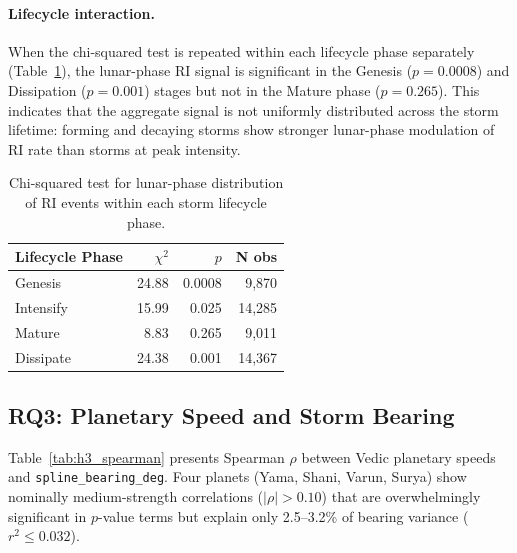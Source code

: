 \documentclass[12pt,a4paper]{article}
\begin{document}
\paragraph{Lifecycle interaction.}
When the chi-squared test is repeated within each lifecycle phase separately
(Table~\ref{tab:ri_lifecycle}), the lunar-phase RI signal is significant in
the Genesis ($p = 0.0008$) and Dissipation ($p = 0.001$) stages but
not in the Mature phase ($p = 0.265$).
This indicates that the aggregate signal is not uniformly distributed across
the storm lifetime: forming and decaying storms show stronger lunar-phase
modulation of RI rate than storms at peak intensity.

\begin{table}[H]
  \centering
  \caption{Chi-squared test for lunar-phase distribution of RI events
           within each storm lifecycle phase.}
  \label{tab:ri_lifecycle}
  \begin{tabular}{lrrr}
    \toprule
    \textbf{Lifecycle Phase} & \boldmath$\chi^2$ & \boldmath$p$ & \textbf{N obs} \\
    \midrule
    Genesis       & 24.88 & 0.0008 & 9{,}870 \\
    Intensify     & 15.99 & 0.025  & 14{,}285 \\
    Mature        &  8.83 & 0.265  & 9{,}011 \\
    Dissipate     & 24.38 & 0.001  & 14{,}367 \\
    \bottomrule
  \end{tabular}
\end{table}

\subsection{RQ3: Planetary Speed and Storm Bearing}
\label{sec:h3}

Table~\ref{tab:h3_spearman} presents Spearman $\rho$ between Vedic planetary
speeds and \texttt{spline\_bearing\_deg}.
Four planets (Yama, Shani, Varun, Surya) show nominally medium-strength
correlations ($|\rho| > 0.10$) that are overwhelmingly significant in $p$-value
terms but explain only 2.5--3.2\% of bearing variance ($r^2 \leq 0.032$).
\end{document}
